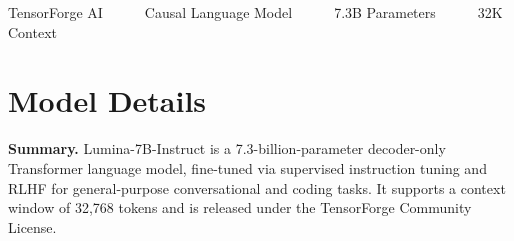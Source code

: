 \documentclass[11pt,a4paper]{article}
\begin{document}
\vspace*{2.8cm}

{\small\color{medium}TensorForge AI~~~\textbullet~~~Causal Language Model~~~\textbullet~~~7.3B Parameters~~~\textbullet~~~32K Context}
\vspace{10pt}

\section{Model Details}

\begin{infobox}
  \textbf{Summary.} Lumina-7B-Instruct is a 7.3-billion-parameter decoder-only
  Transformer language model, fine-tuned via supervised instruction tuning and
  RLHF for general-purpose conversational and coding tasks. It supports a context
  window of 32,768 tokens and is released under the TensorForge Community License.
\end{infobox}

\vspace{6pt}
\end{document}
